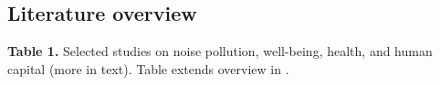 \documentclass[11pt]{article}
\begin{document}
\begin{landscape}
\thispagestyle{empty}
\begingroup
\newsavebox{\literaturepagebox}
\begin{lrbox}{\literaturepagebox}
\begin{minipage}{\linewidth}
\subsection*{Literature overview}
\vspace{0.7cm}
\noindent
{\footnotesize {}\label{tab1}\textbf{Table 1.} Selected studies on noise pollution, well-being, health, and human capital (more in text). Table extends overview  in \textcite{nybergAirNoisePollution2025}.\par}
\vspace{4pt}


\end{minipage}
\end{lrbox}
\end{landscape}
\end{document}
